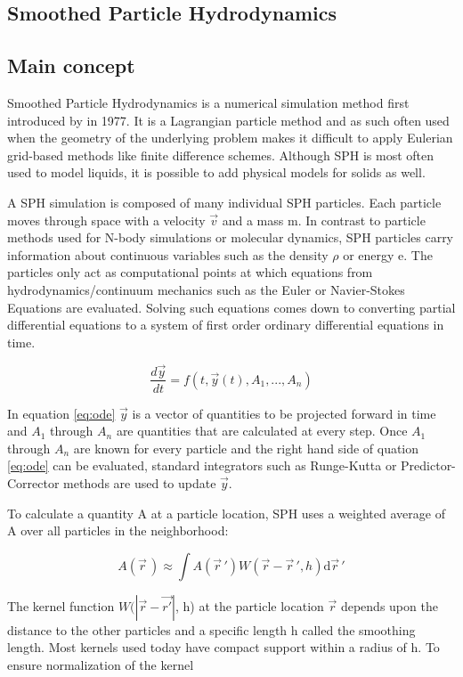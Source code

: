 \subsection{Smoothed Particle Hydrodynamics}
\subsection{Main concept}
Smoothed Particle Hydrodynamics is a numerical simulation method first introduced by \cite{Monaghan_1977} in 1977. It is a Lagrangian particle method and as such often used when the geometry of the underlying problem makes it difficult to apply Eulerian grid-based methods like finite difference schemes. Although SPH is most often used to model liquids, it is possible to add physical models for solids as well.

A SPH simulation is composed of many individual SPH particles. Each particle moves through space with a velocity $\vec{v}$ and a mass m. In contrast to particle methods used for N-body simulations or molecular dynamics, SPH particles carry information about continuous variables such as the density $\rho$ or energy e. The particles only act as computational points at which equations from hydrodynamics/continuum mechanics such as the Euler or Navier-Stokes Equations are evaluated. Solving such equations comes down to converting partial differential equations to a system of first order ordinary differential equations in time.

\begin{equation} \label{eq:ode}
    \frac{d\vec{y}}{dt} = f(t, \vec{y}(t), A_1, ..., A_n)
\end{equation}

In equation \ref{eq:ode} $\vec{y}$ is a vector of quantities to be projected forward in time and $A_1$ through $A_n$ are quantities that are calculated at every step. Once $A_1$ through $A_n$ are known for every particle and the right hand side of quation \ref{eq:ode} can be evaluated, standard integrators such as Runge-Kutta or Predictor-Corrector methods are used to update $\vec{y}$.

To calculate a quantity A at a particle location, SPH uses a weighted average of A over all particles in the neighborhood:

\begin{equation}
    A(\vec{r}\,) \approx \int A(\vec{r}\,') W(\vec{r} - \vec{r}\,', h) \mathrm d\vec{r}\,'
\end{equation}

The kernel function $W(|\vec{r} - \vec{r'}|$, h) at the particle location $\vec{r}$ depends upon the distance to the other particles and a specific length h called the smoothing length. Most kernels used today have compact support within a radius of h. To ensure normalization of the kernel


